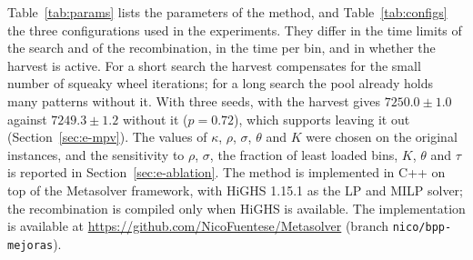 Table~\ref{tab:params} lists the parameters of the method, and Table~\ref{tab:configs} the three
configurations used in the experiments. They differ in the time limits of the search and of the
recombination, in the time per bin, and in whether the harvest is active. For a short search the
harvest compensates for the small number of squeaky wheel iterations; for a long search the
pool already holds many patterns without it.
With three seeds, \cfgqual{} with the harvest gives $7250.0\pm 1.0$ against $7249.3\pm 1.2$ without it ($p=0.72$), which supports leaving it out (Section~\ref{sec:e-mpv}).
The values of $\kappa$, $\rho$, $\sigma$, $\theta$ and $K$ were chosen on the original instances, and the sensitivity to $\rho$, $\sigma$, the fraction of least loaded bins, $K$, $\theta$ and $\tau$ is reported in Section~\ref{sec:e-ablation}.
The method is implemented in C++ on top of the
Metasolver framework, with HiGHS 1.15.1 as the LP and MILP solver; the recombination is
compiled only when HiGHS is available. The implementation is available at \url{https://github.com/NicoFuentese/Metasolver} (branch \texttt{nico/bpp-mejoras}).

